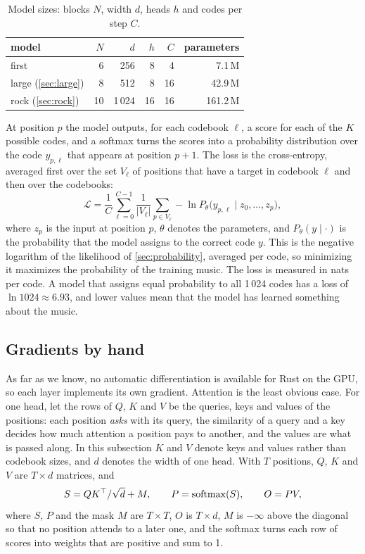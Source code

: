 \begin{table}[htbp]
\centering
\caption{Model sizes: blocks $N$, width $d$, heads $h$ and codes per step $C$.}
\label{tab:models}
\footnotesize
\setlength{\tabcolsep}{5pt}
\begin{tabular}{lrrrrr}
\toprule
model & $N$ & $d$ & $h$ & $C$ & parameters \\
\midrule
first & 6 & 256 & 8 & 4 & 7.1\,M \\
large (\cref{sec:large}) & 8 & 512 & 8 & 16 & 42.9\,M \\
rock (\cref{sec:rock}) & 10 & 1\,024 & 16 & 16 & 161.2\,M \\
\bottomrule
\end{tabular}
\end{table}

At position $p$ the model outputs, for each codebook $\ell$, a score for each of
the $K$ possible codes, and a softmax turns the scores into a probability
distribution over the code $y_{p,\ell}$ that appears at position $p + 1$. The
loss is the cross-entropy, averaged first over the set $V_\ell$ of positions
that have a target in codebook $\ell$ and then over the codebooks:
\[
\mathcal{L} = \frac{1}{C} \sum_{\ell=0}^{C-1} \frac{1}{|V_\ell|} \sum_{p \in V_\ell} -\ln P_\theta\big(y_{p,\ell} \mid z_0, \dots, z_p\big),
\]
where $z_p$ is the input at position $p$, $\theta$ denotes the parameters, and
$P_\theta(y \mid \cdot)$ is the probability that the model assigns to the correct
code $y$. This is the negative logarithm of the likelihood of
\cref{sec:probability}, averaged per code, so minimizing it maximizes the
probability of the training music. The loss is measured in nats per code. A model that assigns equal
probability to all 1\,024 codes has a loss of $\ln 1024 \approx 6.93$, and lower
values mean that the model has learned something about the music.

\subsection{Gradients by hand}

As far as we know, no automatic differentiation is available for Rust on the
GPU, so each layer implements its own gradient. Attention is the least
obvious case. For one head, let the rows of $Q$, $K$ and $V$ be the queries,
keys and values of the positions: each position \emph{asks} with its query,
the similarity of a query and a key decides how much attention a position
pays to another, and the values are what is passed along. In this subsection
$K$ and $V$ denote keys and values rather than codebook sizes, and $d$ denotes
the width of one head. With $T$ positions, $Q$, $K$ and $V$ are $T \times d$
matrices, and
\[
S = QK^\top/\sqrt d + M, \qquad P = \operatorname{softmax}(S), \qquad O = PV,
\]
where $S$, $P$ and the mask $M$ are $T \times T$, $O$ is $T \times d$, $M$ is
$-\infty$ above the diagonal so that no position attends to a later one, and the
softmax turns each row of scores into weights that are positive and sum to 1.

